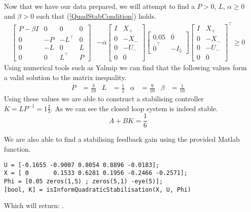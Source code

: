 Now that we have our data prepared, we will attempt to find a $P > 0$, $L$, $\alpha \geq 0$ and $\beta > 0$ such that (\ref{QuadStabCondition}) holds.
\begin{align*}
	\begin{bmatrix}
		P-\beta I&0&0&0\\0&-P&-L^\top&0\\0&-L&0&L\\0&0&L^\top&P
	\end{bmatrix} &- \alpha 
	\begin{bmatrix} I&X_+ \\ 0 & -X_- \\ 0&-U_-\\0&\overline{0} \end{bmatrix}
	\begin{bmatrix} 0.05 & \overline{0} \\ \overline{0}^\top & -I_5 \end{bmatrix}
	\begin{bmatrix} I&X_+ \\ 0 & -X_- \\ 0&-U_-\\0&\overline{0} \end{bmatrix}^\top \geq 0 
\end{align*}
Using numerical tools such as Yalmip we can find that the following values form a valid solution to the matrix inequality.
\begin{align*}
	P &= \frac{3}{10} & L &= \frac{1}{2} & \alpha &= \frac{9}{10} & \beta &= \frac{1}{10}
\end{align*}
Using these values we are able to construct a stabilising controller $K = LP^{-1} = 1\frac{2}{3}$. As we can see the closed loop system is indeed stable.
\begin{equation*}
	A + BK = \frac{1}{6}
\end{equation*}

We are also able to find a stabilising feedback gain using the provided Matlab function.
\begin{lstlisting}
U = [-0.1655 -0.9007 0.8054 0.8896 -0.0183];
X = [ 0       0.1533 0.6281 0.1956 -0.2466 -0.2571];
Phi = [0.05 zeros(1,5) ; zeros(5,1) -eye(5)];
[bool, K] = isInformQuadraticStabilisation(X, U, Phi)
\end{lstlisting}
Which will return: \mon{[ 1, 1.6977 ]}.
























